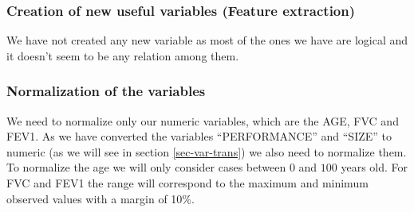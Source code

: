 

\subsubsection{Creation of new useful variables (Feature extraction)}

We have not created any new variable as most of the ones we have are logical and it doesn't seem to be any relation among them.


\subsubsection{Normalization of the variables}
We need to normalize only our numeric variables, which are the AGE, FVC and FEV1. As we have converted the variables ``PERFORMANCE'' and ``SIZE'' to numeric (as we will see in section \ref{sec-var-trans}) we also need to normalize them.
To normalize the age we will only consider cases between $0$ and $100$ years old.
For FVC and FEV1 the range will correspond to the maximum and minimum observed values with a margin of 10\%.









